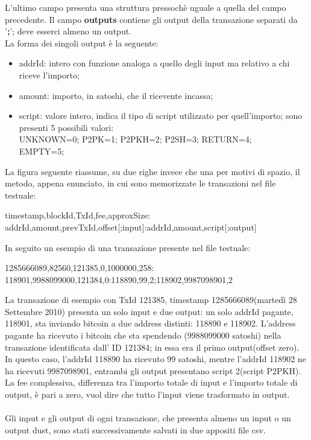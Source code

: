 L'ultimo campo presenta una struttura pressochè uguale a quella del campo precedente.
Il campo \textbf{outputs} contiene gli output della transazione separati da '\textbf{;}'; deve esserci almeno un output.\\
La forma dei singoli output è la seguente:
\begin{itemize}
    \item addrId: intero con funzione analoga a quello degli input ma relativo a chi riceve l'importo; 
    \item amount: importo, in satoshi, che il ricevente incassa;
    \item script: valore intero, indica il tipo di script utilizzato per quell'importo; sono presenti 5 possibili valori: \\UNKNOWN=0; P2PK=1; P2PKH=2; P2SH=3; RETURN=4;\\ EMPTY=5;
\end{itemize}
La figura seguente riassume, su due righe invece che una per motivi di spazio, il metodo, appena enunciato, in cui sono memorizzate le transazioni nel file testuale:
\begin{mdframed}
timestamp,blockId,TxId,fee,approxSize:\\addrId,amount,prevTxId,offset[;input]:addrId,amount,script[;output]
\end{mdframed}
In seguito un esempio di una transazione presente nel file testuale:
\begin{mdframed}
1285666089,82560,121385,0,1000000,258:\\118901,9988099000,121384,0:118890,99,2;118902,9987098901,2
\end{mdframed}
La transazione di esempio con TxId 121385, timestamp 1285666089(martedì 28 Settembre 2010) presenta un solo input e due output: un solo addrId pagante, 118901, sta inviando
bitcoin a due address distinti: 118890 e 118902. L’address pagante
ha ricevuto i bitcoin che sta spendendo (9988099000 satoshi) nella transazione identificata dall' ID 121384; in essa era il primo output(offset zero). In questo caso, l’addrId 118890 ha ricevuto 99 satoshi, mentre l’addrId 118902 ne ha ricevuti 9987098901, entrambi gli output presentano script 2(script P2PKH). La fee complessiva, differenza tra l'importo totale di input e l'importo totale di output, è pari a zero, vuol dire che tutto l'input viene trasformato in output.\\\\
Gli input e gli output di ogni transazione, che presenta almeno un input o un output dust, sono stati successivamente salvati in due appositi file csv.\\
